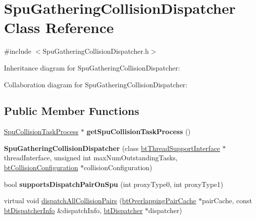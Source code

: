 \hypertarget{class_spu_gathering_collision_dispatcher}{\section{Spu\+Gathering\+Collision\+Dispatcher Class Reference}
\label{class_spu_gathering_collision_dispatcher}
}


{\ttfamily \#include $<$Spu\+Gathering\+Collision\+Dispatcher.\+h$>$}



Inheritance diagram for Spu\+Gathering\+Collision\+Dispatcher\+:


Collaboration diagram for Spu\+Gathering\+Collision\+Dispatcher\+:
\subsection*{Public Member Functions}
\begin{DoxyCompactItemize}
\item 
\hypertarget{class_spu_gathering_collision_dispatcher_a161ec31e4f2d95b31c42247ca4793361}{\hyperlink{class_spu_collision_task_process}{Spu\+Collision\+Task\+Process} $\ast$ {\bfseries get\+Spu\+Collision\+Task\+Process} ()}\label{class_spu_gathering_collision_dispatcher_a161ec31e4f2d95b31c42247ca4793361}

\item 
\hypertarget{class_spu_gathering_collision_dispatcher_a41acdb98571a2159f5b7b3c406930d55}{{\bfseries Spu\+Gathering\+Collision\+Dispatcher} (class \hyperlink{classbt_thread_support_interface}{bt\+Thread\+Support\+Interface} $\ast$thread\+Interface, unsigned int max\+Num\+Outstanding\+Tasks, \hyperlink{classbt_collision_configuration}{bt\+Collision\+Configuration} $\ast$collision\+Configuration)}\label{class_spu_gathering_collision_dispatcher_a41acdb98571a2159f5b7b3c406930d55}

\item 
\hypertarget{class_spu_gathering_collision_dispatcher_a47119970f11e80bd70b322ad2556d1b2}{bool {\bfseries supports\+Dispatch\+Pair\+On\+Spu} (int proxy\+Type0, int proxy\+Type1)}\label{class_spu_gathering_collision_dispatcher_a47119970f11e80bd70b322ad2556d1b2}

\item 
virtual void \hyperlink{class_spu_gathering_collision_dispatcher_a320d5506ca57092359f6508f12196ddb}{dispatch\+All\+Collision\+Pairs} (\hyperlink{classbt_overlapping_pair_cache}{bt\+Overlapping\+Pair\+Cache} $\ast$pair\+Cache, const \hyperlink{structbt_dispatcher_info}{bt\+Dispatcher\+Info} \&dispatch\+Info, \hyperlink{classbt_dispatcher}{bt\+Dispatcher} $\ast$dispatcher)
\end{DoxyCompactItemize}
